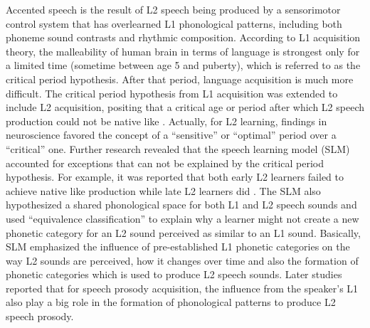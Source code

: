 Accented speech is the result of L2 speech being produced by a sensorimotor control system that has overlearned L1 phonological patterns, including both phoneme sound contrasts and rhythmic composition. According to L1 acquisition theory, the malleability of human brain in terms of language is strongest only for a limited time (sometime between age 5 and puberty), which is referred to as the critical period hypothesis. After that period, language acquisition is much more difficult. The critical period hypothesis from L1 acquisition was extended to include L2 acquisition, positing that a critical age or period after which L2 speech production could not be native like \citep{long1990maturational}. Actually, for L2 learning, findings in neuroscience favored the concept of a ``sensitive'' or ``optimal'' period over a ``critical'' one. Further research revealed that the speech learning model (SLM) accounted for exceptions that can not be explained by the critical period hypothesis. For example, it was reported that both early L2 learners failed to achieve native like production while late L2 learners did \citep{flege1995second}. The SLM also hypothesized a shared phonological space for both L1 and L2 speech sounds and used ``equivalence classification'' to explain why a learner might not create a new phonetic category for an L2 sound perceived as similar to an L1 sound. Basically, SLM emphasized the influence of pre-established L1 phonetic categories on the way L2 sounds are perceived, how it changes over time and also the formation of phonetic categories which is used to produce L2 speech sounds. Later studies reported that for speech prosody acquisition, the influence from the speaker's L1 also play a big role in the formation of phonological patterns to produce L2 speech prosody.


